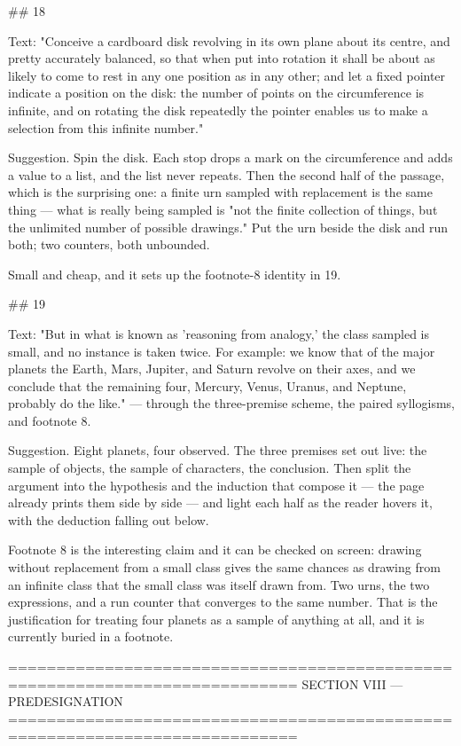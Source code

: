 ## 18

Text: "Conceive a cardboard disk revolving in its own plane about its centre,
and pretty accurately balanced, so that when put into rotation it shall be about
as likely to come to rest in any one position as in any other; and let a fixed
pointer indicate a position on the disk: the number of points on the
circumference is infinite, and on rotating the disk repeatedly the pointer
enables us to make a selection from this infinite number."

Suggestion. Spin the disk. Each stop drops a mark on the circumference and adds
a value to a list, and the list never repeats. Then the second half of the
passage, which is the surprising one: a finite urn sampled with replacement is
the same thing — what is really being sampled is "not the finite collection of
things, but the unlimited number of possible drawings." Put the urn beside the
disk and run both; two counters, both unbounded.

Small and cheap, and it sets up the footnote-8 identity in 19.


## 19

Text: "But in what is known as 'reasoning from analogy,' the class sampled is
small, and no instance is taken twice. For example: we know that of the major
planets the Earth, Mars, Jupiter, and Saturn revolve on their axes, and we
conclude that the remaining four, Mercury, Venus, Uranus, and Neptune, probably
do the like." — through the three-premise scheme, the paired syllogisms, and
footnote 8.

Suggestion. Eight planets, four observed. The three premises set out live: the
sample of objects, the sample of characters, the conclusion. Then split the
argument into the hypothesis and the induction that compose it — the page
already prints them side by side — and light each half as the reader hovers it,
with the deduction falling out below.

Footnote 8 is the interesting claim and it can be checked on screen: drawing
without replacement from a small class gives the same chances as drawing from an
infinite class that the small class was itself drawn from. Two urns, the two
expressions, and a run counter that converges to the same number. That is the
justification for treating four planets as a sample of anything at all, and it
is currently buried in a footnote.


============================================================================
SECTION VIII — PREDESIGNATION
============================================================================

